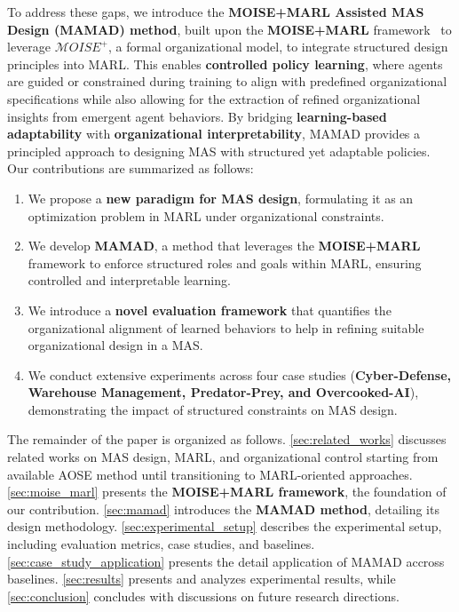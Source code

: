 \documentclass[pdflatex,sn-mathphys-num]{sn-jnl}%
\theoremstyle{thmstyleone}%
\theoremstyle{thmstyletwo}%
\theoremstyle{thmstylethree}%
\begin{document}
To address these gaps, we introduce the \textbf{MOISE+MARL Assisted MAS Design (MAMAD) method}, built upon the \textbf{MOISE+MARL} framework~\cite{soule2025moisemarl} to leverage \textbf{$\mathcal{M}OISE^+$}, a formal organizational model, to integrate structured design principles into MARL. This enables \textbf{controlled policy learning}, where agents are guided or constrained during training to align with predefined organizational specifications while also allowing for the extraction of refined organizational insights from emergent agent behaviors. By bridging \textbf{learning-based adaptability} with \textbf{organizational interpretability}, MAMAD provides a principled approach to designing MAS with structured yet adaptable policies. Our contributions are summarized as follows:

\begin{enumerate}
    \item We propose a \textbf{new paradigm for MAS design}, formulating it as an optimization problem in MARL under organizational constraints.
    \item We develop \textbf{MAMAD}, a method that leverages the \textbf{MOISE+MARL} framework to enforce structured roles and goals within MARL, ensuring controlled and interpretable learning.
    \item We introduce a \textbf{novel evaluation framework} that quantifies the organizational alignment of learned behaviors to help in refining suitable organizational design in a MAS.
    \item We conduct extensive experiments across four case studies (\textbf{Cyber-Defense, Warehouse Management, Predator-Prey, and Overcooked-AI}), demonstrating the impact of structured constraints on MAS design.
\end{enumerate}

The remainder of the paper is organized as follows. \autoref{sec:related_works} discusses related works on MAS design, MARL, and organizational control starting from available AOSE method until transitioning to MARL-oriented approaches. \autoref{sec:moise_marl} presents the \textbf{MOISE+MARL framework}, the foundation of our contribution. \autoref{sec:mamad} introduces the \textbf{MAMAD method}, detailing its design methodology. \autoref{sec:experimental_setup} describes the experimental setup, including evaluation metrics, case studies, and baselines. \autoref{sec:case_study_application} presents the detail application of MAMAD accross baselines. \autoref{sec:results} presents and analyzes experimental results, while \autoref{sec:conclusion} concludes with discussions on future research directions.
\end{document}
